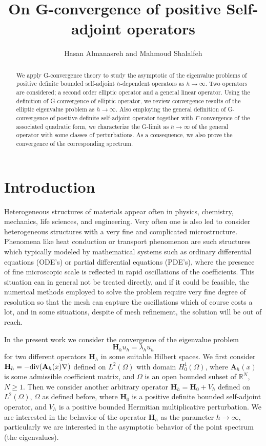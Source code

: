 \documentclass[11pt, epsf]{amsart}
\title{On G-convergence of positive Self-adjoint operators}
\author{Hasan Almanasreh and Mahmoud Shalalfeh}
\begin{document}
\maketitle
\begin{abstract} We apply G-convergence theory to study the asymptotic of the eigenvalue problems of positive definite bounded self-adjoint $h$-dependent operators as $h\to\infty$. Two operators are considered; a second order elliptic operator and a general linear operator. Using the definition of G-convergence of elliptic operator, we review convergence results of the elliptic eigenvalue problem as $h\to\infty$. Also employing the general definition of G-convergence of positive definite self-adjoint operator together with $\Gamma$-convergence of the associated quadratic form, we characterize the G-limit as $h\to\infty$ of the general operator with some classes of perturbations. As a consequence, we also prove the convergence of the corresponding spectrum.
\end{abstract}
\section{Introduction}

Heterogeneous structures of materials appear often in physics, chemistry, mechanics, life sciences, and engineering. Very often one is also led to consider heterogeneous structures with a very fine
and complicated microstructure. Phenomena like heat conduction or transport phenomenon are such structures which typically modeled by mathematical systems such as ordinary differential equations (ODE's) or partial differential equations (PDE's), where the presence of fine microscopic scale is reflected in rapid oscillations of the coefficients. This situation can in general not be treated directly, and if it could be feasible, the numerical methods employed to solve the problem require very fine degree of resolution so that the mesh can capture the oscillations which of course costs a lot, and in some situations, despite of mesh refinement, the solution will be out of reach.

In the present work we consider the convergence of the eigenvalue problem
\vspace{-0.2cm}
\begin{equation*}
\mathbf{H}_hu_h=\lambda_hu_h
\end{equation*}
for two different operators $\mathbf{H}_h$ in some suitable Hilbert spaces. We first consider $\mathbf{H}_h=-{\rm div}(\text{\textbf{A}}_h(x)\nabla)$ defined on $L^2(\Omega)$ with domain $H^1_0(\Omega)$, where $\textbf{A}_h(x)$ is some admissible coefficient matrix, and $\Omega$ is an open bounded subset of $\mathbb{R}^N$, $N\geq1$. Then we consider another arbitrary operator $\mathbf{H}_h=\mathbf{H}_0+V_h$ defined on $L^2(\Omega)$, $\Omega$ as defined before, where $\mathbf{H}_0$ is a positive definite bounded self-adjoint operator, and $V_h$ is a positive bounded Hermitian multiplicative perturbation. We are interested in the behavior of the operator $\mathbf{H}_h$ as the parameter $h\to\infty$, particularly we are interested in the asymptotic behavior of the point spectrum (the eigenvalues).
\end{document}
